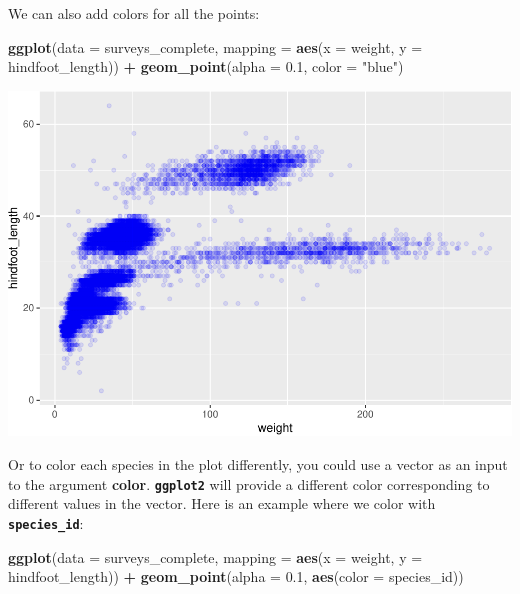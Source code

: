 \documentclass[]{book}
\newenvironment{Shaded}{\begin{snugshade}}{\end{snugshade}}
\newcommand{\KeywordTok}[1]{\textcolor[rgb]{0.13,0.29,0.53}{\textbf{#1}}}
\newcommand{\DataTypeTok}[1]{\textcolor[rgb]{0.13,0.29,0.53}{#1}}
\newcommand{\FloatTok}[1]{\textcolor[rgb]{0.00,0.00,0.81}{#1}}
\newcommand{\StringTok}[1]{\textcolor[rgb]{0.31,0.60,0.02}{#1}}
\newcommand{\OperatorTok}[1]{\textcolor[rgb]{0.81,0.36,0.00}{\textbf{#1}}}
\newcommand{\NormalTok}[1]{#1}
\begin{document}
We can also add colors for all the points:

\begin{Shaded}
\begin{Highlighting}[]
\KeywordTok{ggplot}\NormalTok{(}\DataTypeTok{data =}\NormalTok{ surveys_complete, }\DataTypeTok{mapping =} \KeywordTok{aes}\NormalTok{(}\DataTypeTok{x =}\NormalTok{ weight, }\DataTypeTok{y =}\NormalTok{ hindfoot_length)) }\OperatorTok{+}
\StringTok{    }\KeywordTok{geom_point}\NormalTok{(}\DataTypeTok{alpha =} \FloatTok{0.1}\NormalTok{, }\DataTypeTok{color =} \StringTok{"blue"}\NormalTok{)}
\end{Highlighting}
\end{Shaded}

\includegraphics{img/R-ecology-adding-colors-1.pdf}

Or to color each species in the plot differently, you could use a vector
as an input to the argument \textbf{color}. \textbf{\texttt{ggplot2}}
will provide a different color corresponding to different values in the
vector. Here is an example where we color with
\textbf{\texttt{species\_id}}:

\begin{Shaded}
\begin{Highlighting}[]
\KeywordTok{ggplot}\NormalTok{(}\DataTypeTok{data =}\NormalTok{ surveys_complete, }\DataTypeTok{mapping =} \KeywordTok{aes}\NormalTok{(}\DataTypeTok{x =}\NormalTok{ weight, }\DataTypeTok{y =}\NormalTok{ hindfoot_length)) }\OperatorTok{+}
\StringTok{    }\KeywordTok{geom_point}\NormalTok{(}\DataTypeTok{alpha =} \FloatTok{0.1}\NormalTok{, }\KeywordTok{aes}\NormalTok{(}\DataTypeTok{color =}\NormalTok{ species_id))}
\end{Highlighting}
\end{Shaded}
\end{document}
